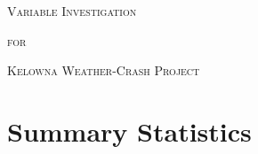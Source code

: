 \documentclass[11pt, a4paper]{article}
\begin{document}


\begin{center}
\Large{\textsc{Variable Investigation}}
\par
\normalsize{\textsc{for}}
\par
\large{\textsc{Kelowna Weather-Crash Project}}
\end{center}


\vspace{0.917 pc} %

\tableofcontents


\pagebreak



\section{Summary Statistics}
\end{document}
